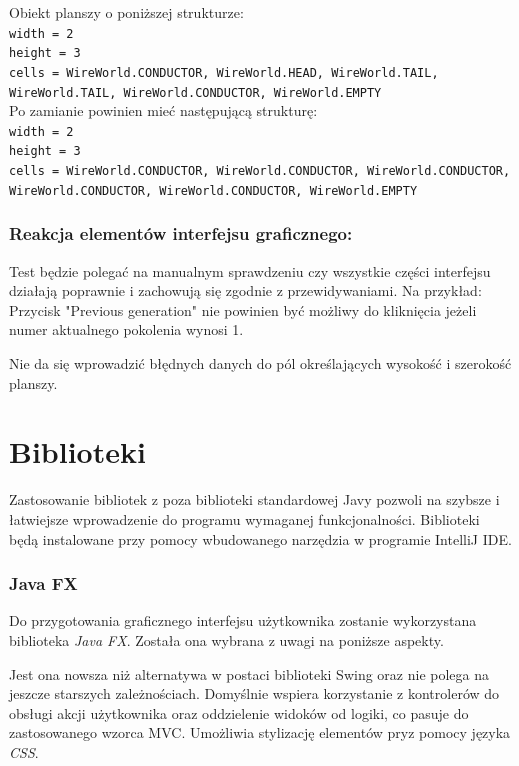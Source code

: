 \documentclass{report}
\begin{document}
Obiekt planszy o poniższej strukturze:\\

\noindent \texttt{width = 2}\\
\texttt{height = 3}\\
\texttt{cells = {WireWorld.CONDUCTOR, WireWorld.HEAD, WireWorld.TAIL, WireWorld.TAIL, WireWorld.CONDUCTOR, WireWorld.EMPTY}}\\

Po zamianie powinien mieć następującą strukturę:\\

\noindent \texttt{width = 2}\\
\texttt{height = 3}\\
\texttt{cells = {WireWorld.CONDUCTOR, WireWorld.CONDUCTOR, WireWorld.CONDUCTOR, WireWorld.CONDUCTOR, WireWorld.CONDUCTOR, WireWorld.EMPTY}}\\

\subsection{Reakcja elementów interfejsu graficznego:}
Test będzie polegać na manualnym sprawdzeniu czy wszystkie części interfejsu działają poprawnie i zachowują się zgodnie z przewidywaniami. Na przykład:\\

Przycisk "Previous generation" nie powinien być możliwy do kliknięcia jeżeli numer aktualnego pokolenia wynosi 1.

Nie da się wprowadzić błędnych danych do pól określających wysokość i szerokość planszy.


\chapter{Biblioteki}
Zastosowanie bibliotek z poza biblioteki standardowej Javy pozwoli na szybsze i łatwiejsze wprowadzenie do programu wymaganej funkcjonalności. Biblioteki będą instalowane przy pomocy wbudowanego narzędzia w programie IntelliJ IDE.

\subsection{Java FX}
Do przygotowania graficznego interfejsu użytkownika zostanie wykorzystana biblioteka \textit{Java FX}. Została ona wybrana z uwagi na poniższe aspekty.

Jest ona nowsza niż alternatywa w postaci biblioteki Swing oraz nie polega na jeszcze starszych zależnościach.
Domyślnie wspiera korzystanie z kontrolerów do obsługi akcji użytkownika oraz oddzielenie widoków od logiki, co pasuje do zastosowanego wzorca MVC.
Umożliwia stylizację elementów pryz pomocy języka \textit{CSS}.
\end{document}
